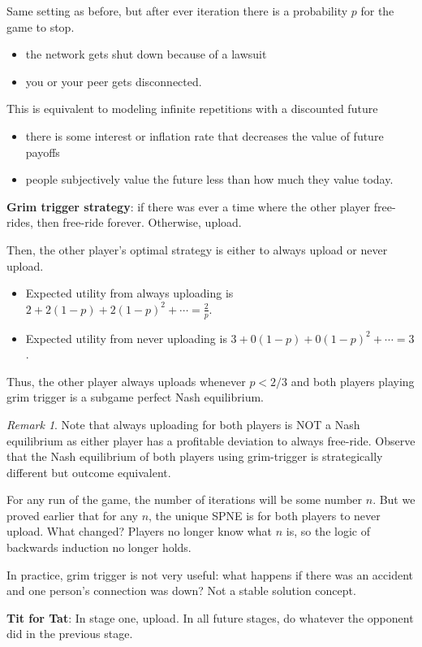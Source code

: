 \documentclass[dvipsnames]{article}
\theoremstyle{definition}
\theoremstyle{remark}
\newtheorem*{remark}{Remark}
\begin{document}
Same setting as before, but after ever iteration there is a probability $p$ for the game to stop.
\begin{itemize}
	\item the network gets shut down because of a lawsuit
	\item you or your peer gets disconnected.
\end{itemize}
This is equivalent to modeling infinite repetitions with a discounted future
\begin{itemize}
	\item there is some interest or inflation rate that decreases the value of future payoffs
	\item people subjectively value the future less than how much they value today.
\end{itemize}

\textbf{Grim trigger strategy}: if there was ever a time where the other player free-rides, then free-ride forever. Otherwise, upload. 

Then, the other player's optimal strategy is either to always upload or never upload. 
\begin{itemize}
	\item Expected utility from always uploading is $2 + 2(1-p) + 2(1-p)^2 + \cdots = \frac{2}{p}$.
	\item Expected utility from never uploading is $3 + 0(1-p) + 0(1-p)^2 + \cdots = 3$.
\end{itemize}
Thus, the other player always uploads whenever $p < 2/3$ and both players playing grim trigger is a subgame perfect Nash equilibrium.

\begin{remark}
	Note that always uploading for both players is NOT a Nash equilibrium as either player has a profitable deviation to always free-ride. Observe that the Nash equilibrium of both players using grim-trigger is strategically different but outcome equivalent. 
\end{remark}

For any run of the game, the number of iterations will be some number $n$. But we proved earlier that for any $n$, the unique SPNE is for both players to never upload. What changed? Players no longer know what $n$ is, so the logic of backwards induction no longer holds.

In practice, grim trigger is not very useful: what happens if there was an accident and one person's connection was down? Not a stable solution concept.

\textbf{Tit for Tat}: In stage one, upload. In all future stages, do whatever the opponent did in the previous stage.
\end{document}
